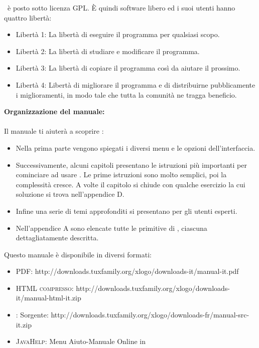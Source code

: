 \xlogo\ è posto sotto licenza GPL. \`E quindi software libero ed i suoi utenti hanno quattro libertà:
\begin{itemize}
\item Libertà 1: La libertà di eseguire il programma per qualsiasi scopo.
\item Libertà 2: La libertà di studiare e modificare il programma.
\item Libertà 3: La libertà di copiare il programma così da aiutare il prossimo.
\item Libertà 4: Libertà di migliorare il programma e di distribuirne pubblicamente i miglioramenti, in modo tale che tutta la comunità ne tragga beneficio.
\end{itemize}
\vspace{0.3cm}
\noindent \textbf{Organizzazione del manuale:}\\ \\
Il manuale ti aiuterà a scoprire \xlogo:
\begin{itemize}
 \item Nella prima parte vengono spiegati i diversi menu e le opzioni dell'interfaccia.
 \item Successivamente, alcuni capitoli presentano le istruzioni più importanti per cominciare ad usare \xlogo. Le prime istruzioni sono molto semplici, poi la complessità cresce. A volte il capitolo si chiude con qualche esercizio la cui soluzione si trova nell'appendice D.
\item Infine una serie di temi approfonditi si presentano per gli utenti esperti.
\item Nell'appendice A sono elencate tutte le primitive di  \xlogo, ciascuna dettagliatamente descritta.
\end{itemize}
\vspace{0.5cm}
Questo manuale è disponibile in diversi formati:
\begin{itemize}
 \item \textsc{PDF}: http://downloads.tuxfamily.org/xlogo/downloads-it/manual-it.pdf
 \item \textsc{HTML compresso}: http://downloads.tuxfamily.org/xlogo/downloads-it/manual-html-it.zip
 \item \LaTeXe: Sorgente: http://downloads.tuxfamily.org/xlogo/downloads-fr/manual-src-it.zip
 \item \textsc{JavaHelp}: Menu Aiuto-Manuale Online in \xlogo
\end{itemize}
